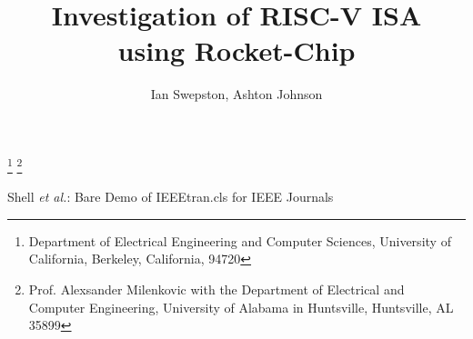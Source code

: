 \documentclass[journal]{IEEEtran}
\begin{document}
%
\title{Investigation of RISC-V ISA\\using Rocket-Chip}

%
%
%

\author{Ian Swepston, Ashton Johnson}%
\thanks{Department of Electrical Engineering and Computer Sciences, University of California, Berkeley, California, 94720}%
\thanks{Prof. Alexsander Milenkovic with the Department of Electrical and \\Computer Engineering, University of Alabama in Huntsville, Huntsville, AL 35899}%

% 
%



%
{Shell \MakeLowercase{\textit{et al.}}: Bare Demo of IEEEtran.cls for IEEE Journals}
% 
\end{document}
